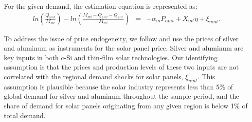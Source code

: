 \documentclass[12pt, letter]{article}
\begin{document}
For the given demand, the estimation equation is represented as:
\begin{eqnarray}
ln( \frac{Q_{nmt}}{M_{mt}} ) - ln( \frac{M_{mt}- Q_{1mt}- Q_{2mt}}{M_{mt}} ) & = &  -\alpha_{m} P_{nmt} + X_{mt}\eta +\xi_{nmt}. \label{eq:demand_est_mkt}
\end{eqnarray}

To address the issue of price endogeneity, we follow \citet{bollinger2025strategic} and use the prices of silver and aluminum as instruments for the solar panel price. Silver and aluminum are key inputs in both c-Si and thin-film solar technologies. Our identifying assumption is that the prices and production levels of these two inputs are not correlated with the  regional demand shocks for solar panels, $\xi_{nmt}$. This assumption is plausible because the solar industry represents less than 5\% of global demand for silver and aluminum throughout the sample period, and the share of demand for solar panels originating from any given region is below 1\% of total demand.


\end{document}
